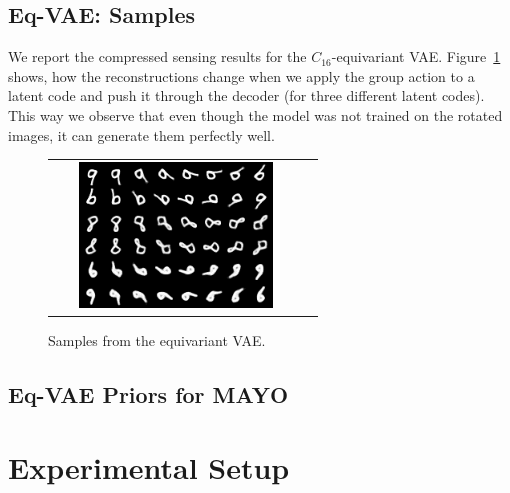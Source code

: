 \subsection{Eq-VAE: Samples}\label{appx:eq_vae_group_sample}
We report the compressed sensing results for the $C_{16}$-equivariant VAE. Figure~\ref{fig:vae_prior_samples} shows, how the reconstructions change when we apply the group action to a latent code and push it through the decoder (for three different latent codes). This way we observe that even though the model was not trained on the rotated images, it can generate them perfectly well.
\begin{figure}[h]
    \centering
    \begin{tabular}{cc}
        \includegraphics[width=0.8\textwidth]{pics/2_equiv_vae/mnist_reconstruction_full_covariance_non-cs.png} 
    \end{tabular}
    \caption{Samples from the equivariant VAE.}
    \label{fig:vae_prior_samples}
\end{figure}


\newpage
\subsection{Eq-VAE Priors for MAYO}\label{appx:eq_vae}






\newpage
\section{Experimental Setup}\label{appx:exp_setup}

